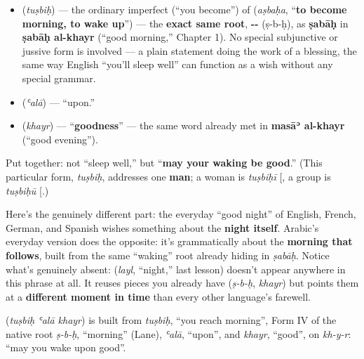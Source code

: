 \begin{itemize}
\raggedright
  \item \textbf{} (\emph{tuṣbiḥ}) — the ordinary imperfect (\textquotedblleft{}you become\textquotedblright{}) of \textbf{} (\emph{aṣbaḥa}, \textquotedblleft{}\textbf{to become morning, to wake up}\textquotedblright{}) — the \textbf{exact same root}, \textbf{--} (ṣ-b-ḥ), as \textbf{ṣabāḥ} in \textbf{ṣabāḥ al-khayr} (\textquotedblleft{}good morning,\textquotedblright{} Chapter 1). No special subjunctive or jussive form is involved — a plain statement doing the work of a blessing, the same way English \textquotedblleft{}you'll sleep well\textquotedblright{} can function as a wish without any special grammar.
  \item \textbf{} (\emph{ʿalā}) — \textquotedblleft{}upon.\textquotedblright{}
  \item \textbf{} (\emph{khayr}) — \textquotedblleft{}\textbf{goodness}\textquotedblright{} — the same word already met in \textbf{masāʾ al-khayr} (\textquotedblleft{}good evening\textquotedblright{}).
\end{itemize}

Put together: not \textquotedblleft{}sleep well,\textquotedblright{} but \textquotedblleft{}\textbf{may your waking be good}.\textquotedblright{} (This particular form, \emph{tuṣbiḥ}, addresses one \textbf{man}; a woman is \emph{tuṣbiḥī} {[}\ar{تصبحي}{]}, a group is \emph{tuṣbiḥū} {[}\ar{تصبحوا}{]}.)

\begin{culture}
Here's the genuinely different part: the everyday \textquotedblleft{}good night\textquotedblright{} of English, French, German, and Spanish wishes something about the \textbf{night itself}. Arabic's everyday version does the opposite: it's grammatically about the \textbf{morning that follows}, built from the same \textquotedblleft{}waking\textquotedblright{} root already hiding in \emph{ṣabāḥ}. Notice what's genuinely absent: \textbf{} (\emph{layl}, \textquotedblleft{}night,\textquotedblright{} last lesson) doesn't appear anywhere in this phrase at all. It reuses pieces you already have (\emph{ṣ-b-ḥ}, \emph{khayr}) but points them at a \textbf{different moment in time} than every other language's farewell.
\end{culture}

\begin{cousinweb}
\textbf{  } (\emph{tuṣbiḥ ʿalā khayr}) is built from \emph{tuṣbiḥ}, \textquotedblleft{}you reach morning\textquotedblright{}, Form IV of the native root \emph{ṣ-b-ḥ}, \textquotedblleft{}morning\textquotedblright{} (Lane), \emph{ʿalā}, \textquotedblleft{}upon\textquotedblright{}, and \emph{khayr}, \textquotedblleft{}good\textquotedblright{}, on \emph{kh-y-r}: \textquotedblleft{}may you wake upon good\textquotedblright{}.
\end{cousinweb}


